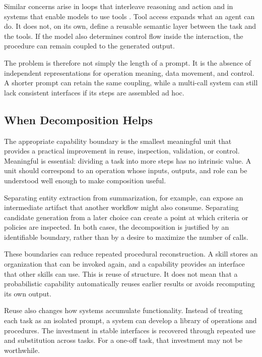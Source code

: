 \documentclass[10pt,twocolumn,a4paper]{article}
\begin{document}
Similar concerns arise in loops that interleave reasoning and action \cite{r2} and in systems that enable models to use tools \cite{r3}. Tool access expands what an agent can do. It does not, on its own, define a reusable semantic layer between the task and the tools. If the model also determines control flow inside the interaction, the procedure can remain coupled to the generated output.


The problem is therefore not simply the length of a prompt. It is the absence of independent representations for operation meaning, data movement, and control. A shorter prompt can retain the same coupling, while a multi-call system can still lack consistent interfaces if its steps are assembled ad hoc.


\subsection{When Decomposition Helps}

The appropriate capability boundary is the smallest meaningful unit that provides a practical improvement in reuse, inspection, validation, or control. Meaningful is essential: dividing a task into more steps has no intrinsic value. A unit should correspond to an operation whose inputs, outputs, and role can be understood well enough to make composition useful.


Separating entity extraction from summarization, for example, can expose an intermediate artifact that another workflow might also consume. Separating candidate generation from a later choice can create a point at which criteria or policies are inspected. In both cases, the decomposition is justified by an identifiable boundary, rather than by a desire to maximize the number of calls.


These boundaries can reduce repeated procedural reconstruction. A skill stores an organization that can be invoked again, and a capability provides an interface that other skills can use. This is reuse of structure. It does not mean that a probabilistic capability automatically reuses earlier results or avoids recomputing its own output.


Reuse also changes how systems accumulate functionality. Instead of treating each task as an isolated prompt, a system can develop a library of operations and procedures. The investment in stable interfaces is recovered through repeated use and substitution across tasks. For a one-off task, that investment may not be worthwhile.
\end{document}
